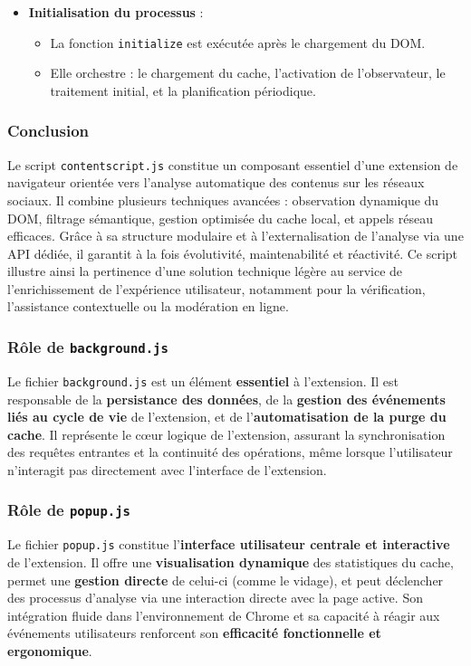 \begin{description}
\begin{itemize}
    \item \textbf{Initialisation du processus} :
    \begin{itemize}
        \item La fonction \texttt{initialize} est exécutée après le chargement du DOM.
        \item Elle orchestre : le chargement du cache, l’activation de l’observateur, le traitement initial, et la planification périodique.
    \end{itemize}
\end{itemize}

\subsubsection*{ Conclusion}

Le script \texttt{contentscript.js} constitue un composant essentiel d’une extension de navigateur orientée vers l’analyse automatique des contenus sur les réseaux sociaux. Il combine plusieurs techniques avancées : observation dynamique du DOM, filtrage sémantique, gestion optimisée du cache local, et appels réseau efficaces. Grâce à sa structure modulaire et à l’externalisation de l’analyse via une API dédiée, il garantit à la fois évolutivité, maintenabilité et réactivité. Ce script illustre ainsi la pertinence d’une solution technique légère au service de l’enrichissement de l’expérience utilisateur, notamment pour la vérification, l’assistance contextuelle ou la modération en ligne.



\subsubsection*{Rôle de \texttt{background.js}}
Le fichier \texttt{background.js} est un élément \textbf{essentiel} à l'extension. Il est responsable de la \textbf{persistance des données}, de la \textbf{gestion des événements liés au cycle de vie} de l'extension, et de l'\textbf{automatisation de la purge du cache}. Il représente le cœur logique de l'extension, assurant la synchronisation des requêtes entrantes et la continuité des opérations, même lorsque l'utilisateur n'interagit pas directement avec l'interface de l'extension.
\subsubsection*{Rôle de \texttt{popup.js}}
Le fichier \texttt{popup.js} constitue l'\textbf{interface utilisateur centrale et interactive} de l'extension. Il offre une \textbf{visualisation dynamique} des statistiques du cache, permet une \textbf{gestion directe} de celui-ci (comme le vidage), et peut déclencher des processus d'analyse via une interaction directe avec la page active. Son intégration fluide dans l'environnement de Chrome et sa capacité à réagir aux événements utilisateurs renforcent son \textbf{efficacité fonctionnelle et ergonomique}.


\end{description}
